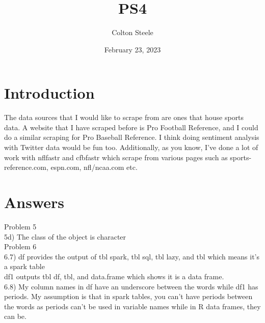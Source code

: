 \documentclass{article}
\title{PS4}
\author{Colton Steele}
\date{February 23, 2023}
\begin{document}
\maketitle


\section{Introduction}

The data sources that I would like to scrape from are ones that house sports data. A website that I have scraped before is Pro Football Reference, and I could do a similar scraping for Pro Baseball Reference. I think doing sentiment analysis with Twitter data would be fun too. Additionally, as you know, I've done a lot of work with nflfastr and cfbfastr which scrape from various pages such as sports-reference.com, espn.com, nfl/ncaa.com etc. 

\section{Answers}
Problem 5
\\5d) The class of the object is character
\\Problem 6
\\6.7) df provides the output of tbl spark, tbl sql, tbl lazy, and tbl which means it's a spark table
\\df1 outputs tbl df, tbl, and data.frame which shows it is a data frame.
\\6.8) My column names in df have an underscore between the words while df1 has periods. My assumption is that in spark tables, you can't have periods between the words as periods can't be used in variable names while in R data frames, they can be.
\end{document}
